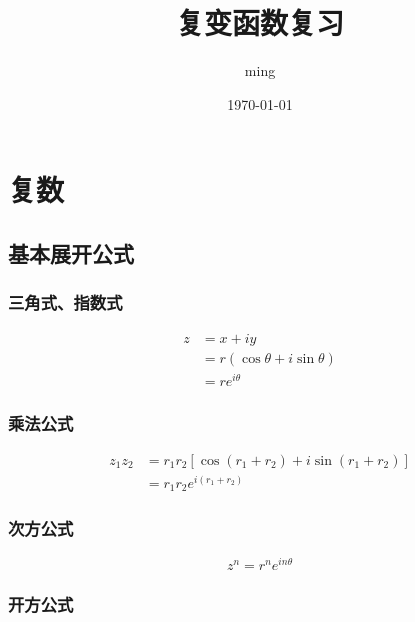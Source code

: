 \documentclass{article}
\title{复变函数复习}
\author{ming}
\date{\today}
\begin{document}
\maketitle

\section{复数}


\subsection{基本展开公式}

\subsubsection{三角式、指数式}

\begin{equation}
    \begin{aligned}
        z &= x + iy \\
          &= r(\cos \theta + i \sin \theta) \\
          &= r e^{i \theta}
    \end{aligned}
\end{equation}

\subsubsection{乘法公式}

\begin{equation}
    \begin{aligned}
        z_1 z_2 &= r_1 r_2 [\cos(r_1+r_2) + i \sin(r_1+r_2)] \\
                &= r_1 r_2 e^{i(r_1+r_2)}
    \end{aligned}
\end{equation}

\subsubsection{次方公式}

\begin{equation}
    z^n = r^n e^{i n \theta} 
\end{equation}

\subsubsection{开方公式}
\end{document}
